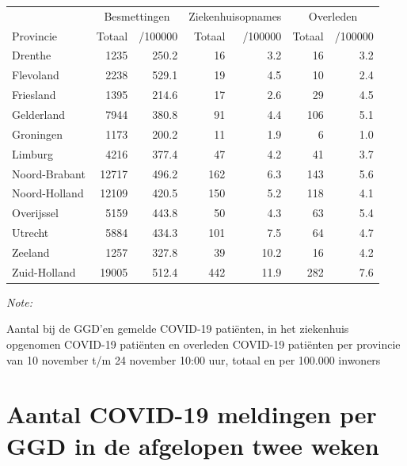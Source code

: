 \documentclass[
  english,
  man,floatsintext]{apa6}
\begin{document}
\begin{table}[H]
\centering
\begin{threeparttable}
\begin{tabular}{lrrrrrr}
\toprule
\multicolumn{1}{c}{ } & \multicolumn{2}{c}{Besmettingen} & \multicolumn{2}{c}{Ziekenhuisopnames} & \multicolumn{2}{c}{Overleden} \\
\cmidrule(l{3pt}r{3pt}){2-3} \cmidrule(l{3pt}r{3pt}){4-5} \cmidrule(l{3pt}r{3pt}){6-7}
Provincie & Totaal & /100000 & Totaal & /100000 & Totaal & /100000\\
\midrule
Drenthe & 1235 & 250.2 & 16 & 3.2 & 16 & 3.2\\
Flevoland & 2238 & 529.1 & 19 & 4.5 & 10 & 2.4\\
Friesland & 1395 & 214.6 & 17 & 2.6 & 29 & 4.5\\
Gelderland & 7944 & 380.8 & 91 & 4.4 & 106 & 5.1\\
Groningen & 1173 & 200.2 & 11 & 1.9 & 6 & 1.0\\
Limburg & 4216 & 377.4 & 47 & 4.2 & 41 & 3.7\\
Noord-Brabant & 12717 & 496.2 & 162 & 6.3 & 143 & 5.6\\
Noord-Holland & 12109 & 420.5 & 150 & 5.2 & 118 & 4.1\\
Overijssel & 5159 & 443.8 & 50 & 4.3 & 63 & 5.4\\
Utrecht & 5884 & 434.3 & 101 & 7.5 & 64 & 4.7\\
Zeeland & 1257 & 327.8 & 39 & 10.2 & 16 & 4.2\\
Zuid-Holland & 19005 & 512.4 & 442 & 11.9 & 282 & 7.6\\
\bottomrule
\end{tabular}
\begin{tablenotes}
\item \textit{Note: } 
\item Aantal bij de GGD’en gemelde COVID-19 patiënten, in het ziekenhuis opgenomen COVID-19 patiënten en overleden COVID-19 patiënten per provincie van 10 november t/m 24 november 10:00 uur, totaal en per 100.000 inwoners
\end{tablenotes}
\end{threeparttable}
\end{table}

\newpage

\hypertarget{aantal-covid-19-meldingen-per-ggd-in-de-afgelopen-twee-weken}{%
\section{Aantal COVID-19 meldingen per GGD in de afgelopen twee weken}\label{aantal-covid-19-meldingen-per-ggd-in-de-afgelopen-twee-weken}}
\end{document}
